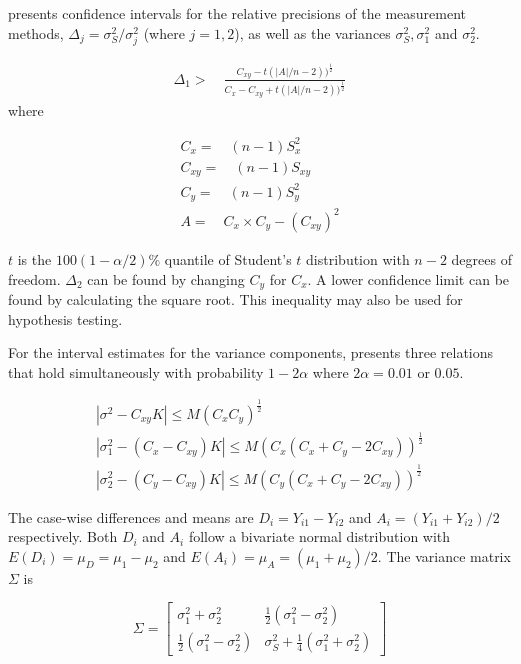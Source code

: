 \documentclass[12pt, a4paper]{article}
\begin{document}
\citet{Thompson}presents confidence intervals for the relative
precisions of the measurement methods, $\Delta_{j}=
\sigma^2_{S}/\sigma^2_{j}$ (where $j=1,2$), as well as the
variances $\sigma^{2}_{S}, \sigma^{2}_{1}$ and $\sigma^{2}_{2}$.

\begin{eqnarray}
\Delta_{1} >\quad \frac{C_{xy}-
t(|A|/n-2))^{\frac{1}{2}}}{C_{x}-C_{xy}+
t(|A|/n-2))^{\frac{1}{2}}}
\end{eqnarray}
where

\begin{eqnarray}
C_{x}=\quad(n-1)S^2_{x}\nonumber\\
C_{xy}=\quad(n-1)S_{xy}\nonumber\\
C_{y}=\quad(n-1)S^2_{y}\nonumber\\
A=\quad C_{x}\times C_{y} - (C_{xy})^2 \nonumber
\end{eqnarray}

$t$ is the $100(1-\alpha/2)\%$ quantile of Student's $t$
distribution with $n-2$ degrees of freedom. $\Delta_{2}$ can be
found by changing $C_{y}$ for $C_{x}$. A lower confidence limit
can be found by calculating the square root. This inequality may
also be used for hypothesis testing.

For the interval estimates for the variance components,
\citet{Thompson} presents three relations that hold simultaneously
with probability $1-2\alpha$ where $2\alpha=0.01$ or $0.05$.

\begin{eqnarray}
|\sigma^2-C_{xy}K|\leqslant M(C_{x}C_{y})^{\frac{1}{2}}\\
|\sigma^2_{1}-(C_{x}-C_{xy})K|\leqslant M(C_{x}(C_{x}+C_{y}-2C_{xy}))^{\frac{1}{2}}\nonumber\\
|\sigma^2_{2}-(C_{y}-C_{xy})K|\leqslant
M(C_{y}(C_{x}+C_{y}-2C_{xy}))^{\frac{1}{2}}\nonumber
\end{eqnarray}

The case-wise differences and means are $D_{i} = Y_{i1}-Y_{i2}$
and $A_{i} = (Y_{i1}+Y_{i2})/2$  respectively. Both $D_{i}$ and
$A_{i}$ follow a bivariate normal distribution with $E(D_{i})=
\mu_{D} = \mu_{1} - \mu_{2}$ and $E(A_{i})= \mu_{A} = (\mu_{1} +
\mu_{2})/2$. The variance matrix $\Sigma$ is

\begin{equation}
\Sigma = \left[\begin{matrix}
\sigma^{2}_{1}+\sigma^{2}_{2}&\frac{1}{2}(\sigma^{2}_{1}-\sigma^{2}_{2})\\
\frac{1}{2}(\sigma^{2}_{1}-\sigma^{2}_{2})&\sigma^{2}_{S}+
\frac{1}{4}(\sigma^{2}_{1}+\sigma^{2}_{2})
\end{matrix} \right]
\end{equation}
\end{document}
